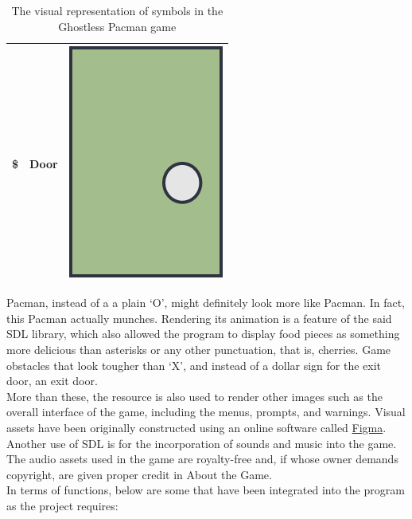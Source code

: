 \begin{table}[H]
\begin{tabular}{ c c c }
        \$ & Door & \includegraphics[scale=0.1]{assets/door_sample.png}\\
        \bottomrule
    \end{tabular}
    \caption{The visual representation of symbols in the Ghostless Pacman game}
    \label{tab:1}
\end{table}

Pacman, instead of a a plain `O', might definitely look more like Pacman. In
fact, this Pacman actually munches. Rendering its animation is a feature of the
said SDL library, which also allowed the program to display food pieces
as something more delicious than asterisks or any other punctuation, that is,
cherries. Game obstacles that look tougher than `X', and instead of a
dollar sign for the exit door, an exit door.\\

More than these, the resource is also used to render other images such as the
overall interface of the game, including the menus, prompts, and warnings.
Visual assets have been originally constructed using an online software called
\href{https://www.figma.com/}{Figma}.\\

Another use of SDL is for the incorporation of sounds and music into the game.
The audio assets used in the game are royalty-free and, if whose owner demands
copyright, are given proper credit in About the Game.\\

In terms of functions, below are some that have been integrated into the
program as the project requires:

